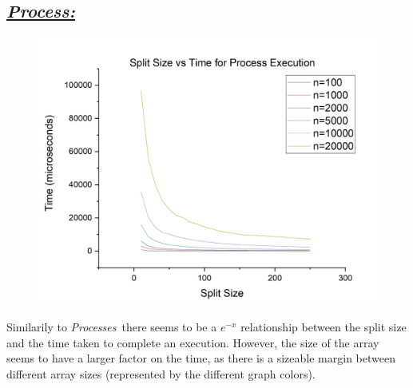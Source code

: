 \documentclass{article}
\begin{document}
            \subsection*{\color{blue}\textit{\underline{Process:}}\color{black}}
                \begin{figure}[H]
                    \centering
                    \includegraphics[width=19cm]{nsvt-Process}
                \end{figure}
                Similarily to \color{blue}\textit{Processes}\color{black}\ there seems to be a $e^{-x}$ relationship between the split size and the time taken to complete an execution. However, the size of the array seems to have a larger factor on the time, as there is a sizeable margin between different array sizes (represented by the different graph colors).
            \pagebreak
\end{document}
